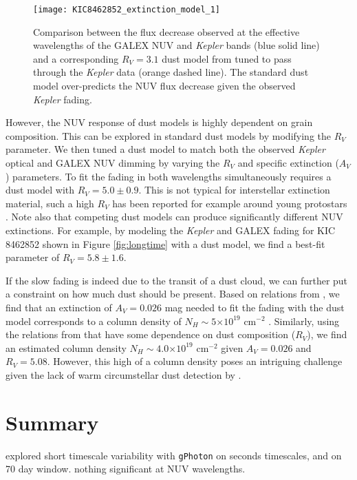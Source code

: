 \documentclass[twocolumn]{aastex6}
\providecommand{\e}[1]{\ensuremath{\times 10^{#1}}}
\newcommand{\Kepler}{\textsl{Kepler}\xspace}
\begin{document}
\begin{figure}[!t]
\centering
\texttt{[image: KIC8462852\_extinction\_model\_1]}
\caption{Comparison between the flux decrease observed at the effective wavelengths of the GALEX NUV and \Kepler bands (blue solid line) and a corresponding $R_V=3.1$ dust model from \citet{cardelli1989} tuned to pass through the \Kepler data (orange dashed line). The standard dust model over-predicts the NUV flux decrease given the observed \Kepler fading.}
\label{fig:dust}
\end{figure}


However, the NUV response of dust models is highly dependent on grain composition. This can be explored in standard dust models by modifying the $R_V$ parameter. We then tuned a dust model to match both the observed \Kepler optical and GALEX NUV dimming by varying the $R_V$ and specific extinction ($A_V$) parameters. To fit the fading in both wavelengths simultaneously requires a dust model with  $R_V=5.0\pm0.9$. This is not typical for interstellar extinction material, such a high $R_V$ has been reported for example around young protostars \citep[e.g.][]{hecht1982}. Note also that competing dust models can produce significantly different NUV extinctions. For example, by modeling the \Kepler and GALEX fading for KIC 8462852 shown in Figure \ref{fig:longtime} with a \citet{fitzpatrick2009} dust model, we find a best-fit parameter of $R_V=5.8\pm1.6$.


If the slow fading is indeed due to the transit of a dust cloud, we can further put a constraint on how much dust should be present. Based on relations from \citep{guver2009}, we find that an extinction of $A_V = 0.026$ mag  needed to fit the fading with the \citet{cardelli1989} dust model  corresponds to a column density of $N_H\sim5\e{19}$ cm$^{-2}$ . Similarly, using the relations from \citet{rachford2002} that have some dependence on dust composition ($R_V$), we find an estimated column density $N_H\sim4.0\e{19}$ cm$^{-2}$  given $A_V = 0.026$ and $R_V=5.08$. However, this high of a column density poses an intriguing challenge given the lack of warm circumstellar dust detection by \citet{thompson2016}.



\section{Summary}
\label{sec:summary}

explored short timescale variability with {\tt gPhoton} on seconds timescales, and on 70 day window. nothing significant at NUV wavelengths.
\end{document}
